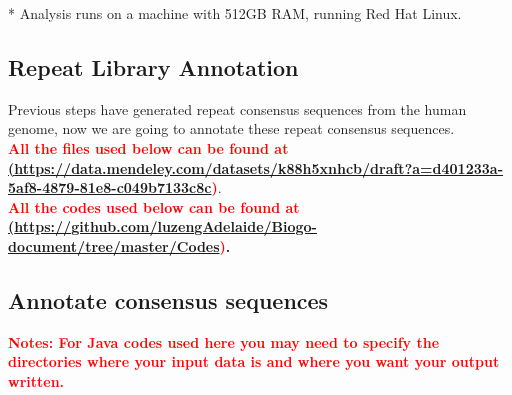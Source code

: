 \documentclass[a4paper,12pt]{article}
\begin{document}
	* Analysis runs on a machine with 512GB RAM, running Red Hat Linux.
	
	\pagebreak
	
	\subsection{Repeat Library Annotation}
	Previous steps have generated repeat consensus sequences from the human genome, now we are going to annotate these repeat consensus sequences. \\
	\textbf{\textcolor{red}{All the files used below can be found at \\
			\href{<url>}(\url{https://data.mendeley.com/datasets/k88h5xnhcb/draft?a=d401233a-5af8-4879-81e8-c049b7133c8c})}}. \\
	\textbf{\textcolor{red}{All the codes used below can be found at \\ \href{<url>}(\url{https://github.com/luzengAdelaide/Biogo-document/tree/master/Codes})}.} 
	
	\subsection{Annotate consensus sequences}
	\textbf{\textcolor{red}{Notes: For Java codes used here you may need to specify the directories where your input data is and where you want your output written. }}
	
\end{document}
